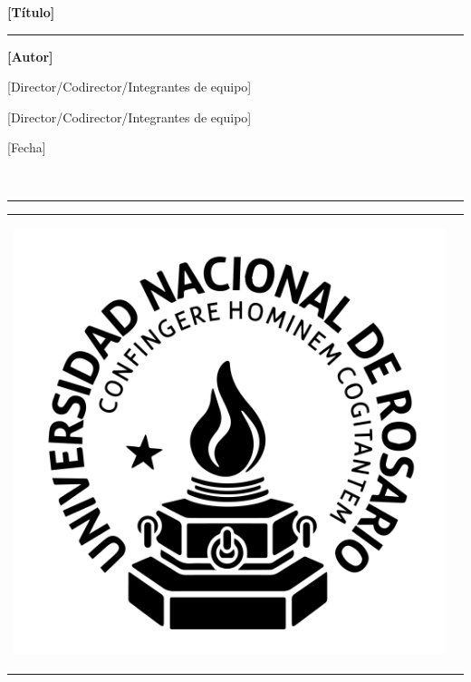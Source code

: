 \documentclass[12pt, spanish]{article}
\begin{document}
\begin{titlepage}
\begin{center}
    \LARGE{\textbf{[Título]}}
    \vspace{0.5cm}
    \hrule

    \vspace{1.5cm}
    \textbf{\Large [Autor]}    

    \vfill
    \vfill

    {\large [Director/Codirector/Integrantes de equipo]}

    {\large [Director/Codirector/Integrantes de equipo]}

    \vfill

    {\Large [Fecha]}
  \end{center} 
\end{titlepage}


\begin{titlepage}
    \thispagestyle{empty}
    \ \vspace{-1.8cm}\par
    \noindent\rule{\textwidth}{0.4pt}\vspace{.4cm}
    \begin{tabular}{cc}
    	\begin{minipage}{0.3\textwidth}     
    		\begin{flushleft}
    			\includegraphics[scale=0.06]{imagenes/Logounr.png}
    		\end{flushleft}     
    		\vspace{2pt}

\end{minipage}
\end{tabular}
\end{titlepage}
\end{document}
